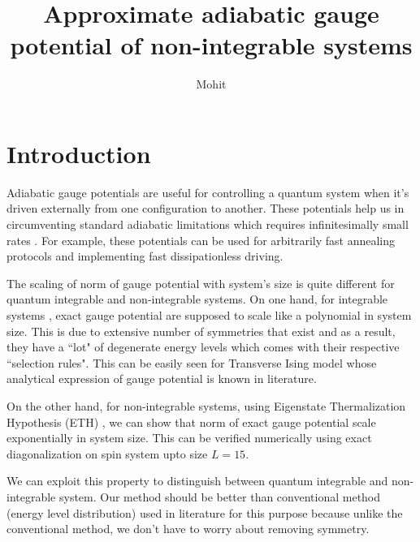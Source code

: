 \documentclass[11pt,a4paper]{article}
\author{Mohit}
\title{Approximate adiabatic gauge potential of non-integrable systems  }
\begin{document}
\maketitle

\section{Introduction}

Adiabatic gauge potentials are useful for controlling a quantum system when it's driven externally from one configuration to another. These potentials help us in  circumventing standard adiabatic limitations which requires infinitesimally small rates \cite{demirplak2003adiabatic,demirplak2005assisted, berry2009transitionless}. For example, these potentials can be used for arbitrarily fast annealing protocols and implementing fast dissipationless driving. 



The scaling of norm of gauge potential with system's size is quite different for  quantum integrable and non-integrable systems. On one hand, for integrable systems , exact gauge potential are supposed to scale like a polynomial in system size. This is due to extensive number of symmetries that exist and as a result, they have a ``lot" of degenerate energy levels which comes with their respective ``selection rules".  This can be easily seen  for Transverse Ising model whose analytical expression of gauge potential is known in literature.

On the other hand, for non-integrable systems, using  Eigenstate Thermalization Hypothesis (ETH)\cite{d2016quantum} , we can show that norm of exact gauge potential scale exponentially in system size. This can be verified numerically using exact diagonalization on spin system upto size $L=15$. 


We can exploit this property to distinguish  between quantum integrable and non-integrable system. Our method should be better than conventional method (energy level distribution) used in literature for this purpose because unlike the conventional method, we don't have to worry about removing symmetry.



 
\end{document}
